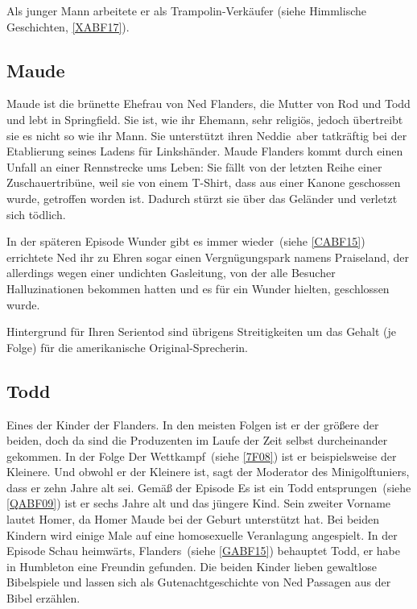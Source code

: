 Als junger Mann arbeitete er als Trampolin-Verkäufer (siehe \glqq Himmlische Geschichten\grqq, \ref{XABF17}).


\subsection{Maude}
Maude ist die brünette Ehefrau von Ned Flanders, die Mutter von Rod und Todd und lebt in Springfield. Sie ist, wie ihr Ehemann, sehr religiös, jedoch übertreibt sie es nicht so wie ihr Mann. Sie unterstützt ihren \glqq Neddie\grqq\ aber tatkräftig bei der Etablierung seines Ladens für Linkshänder. Maude Flanders kommt durch einen Unfall an einer Rennstrecke ums Leben: Sie fällt von der letzten Reihe einer Zuschauertribüne, weil sie von einem T-Shirt, dass aus einer Kanone geschossen wurde, getroffen worden ist. Dadurch stürzt sie über das Geländer und verletzt sich tödlich.

In der späteren Episode \glqq Wunder gibt es immer wieder\grqq\ (siehe \ref{CABF15}) errichtete Ned ihr zu Ehren sogar einen Vergnügungspark namens \glqq Praiseland\grqq , der allerdings wegen einer undichten Gasleitung, von der alle Besucher Halluzinationen bekommen hatten und es für ein Wunder hielten, geschlossen wurde.

Hintergrund für Ihren Serientod sind übrigens Streitigkeiten um das Gehalt (je Folge) für die amerikanische Original-Sprecherin.

\subsection{Todd}\label{ToddFlanders}
Eines der Kinder der Flanders. In den meisten Folgen ist er der größere der beiden, doch da sind die Produzenten im Laufe der Zeit selbst durcheinander gekommen. In der Folge \glqq Der Wettkampf\grqq\ (siehe \ref{7F08}) ist er beispielsweise der Kleinere. Und obwohl er der Kleinere ist, sagt der Moderator des Minigolftuniers, dass er zehn Jahre alt sei. Gemäß der Episode \glqq Es ist ein Todd entsprungen\grqq\ (siehe \ref{QABF09}) ist er sechs Jahre alt und das jüngere Kind. Sein zweiter Vorname lautet Homer, da Homer Maude bei der Geburt unterstützt hat. Bei beiden Kindern wird einige Male auf eine homosexuelle Veranlagung angespielt. In der Episode \glqq Schau heimwärts, Flanders\grqq\ (siehe \ref{GABF15}) behauptet Todd, er habe in Humbleton eine Freundin gefunden. Die beiden Kinder lieben gewaltlose Bibelspiele und lassen sich als Gutenachtgeschichte von Ned Passagen aus der Bibel erzählen.

